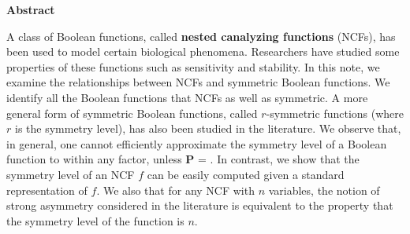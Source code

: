\vspace*{-0.05in}
\begin{center}
\textbf{Abstract}  %
\end{center}

\smallskip

A class of Boolean functions, 
called \textbf{nested canalyzing functions} (NCFs),
has been used to model certain biological phenomena.
Researchers have studied some properties of these functions
such as sensitivity and stability.
In this note, we examine the relationships between NCFs and symmetric 
Boolean functions. 
We identify all the Boolean functions that NCFs as well as symmetric. 
A more general form of symmetric Boolean functions,
called $r$-symmetric functions (where $r$ is the symmetry level),
has also been studied in the literature.
We observe that, in general,
one cannot efficiently approximate the symmetry level of
a Boolean function to within any factor, unless \textbf{P} = \cnp. 
In contrast, we show that the symmetry level of an NCF $f$
can be easily computed given a standard representation of $f$.
We also that for any NCF with $n$ variables, the notion of
strong asymmetry considered in the literature is equivalent to
the property that the symmetry level of the function is $n$.
